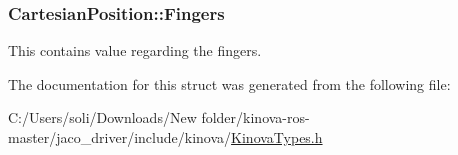 \subsubsection[{\texorpdfstring{Fingers}{Fingers}}]{ Cartesian\+Position\+::\+Fingers}\hypertarget{struct_cartesian_position_ad0d8710c54bb2f63dfc98d809eaeb3a4}{}\label{struct_cartesian_position_ad0d8710c54bb2f63dfc98d809eaeb3a4}


This contains value regarding the fingers. 



The documentation for this struct was generated from the following file\+:\begin{DoxyCompactItemize}
\item 
C\+:/\+Users/soli/\+Downloads/\+New folder/kinova-\/ros-\/master/jaco\+\_\+driver/include/kinova/\hyperlink{_kinova_types_8h}{Kinova\+Types.\+h}\end{DoxyCompactItemize}
